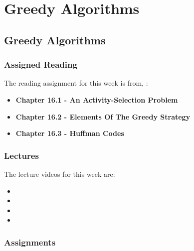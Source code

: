 \clearpage

\renewcommand{\ChapTitle}{Greedy Algorithms}
\renewcommand{\SectionTitle}{Greedy Algorithms}

\chapter{\ChapTitle}
\section{\SectionTitle}

\subsection{Assigned Reading}

The reading assignment for this week is from, \Textbook:

\begin{itemize}
    \item \textbf{Chapter 16.1 - An Activity-Selection Problem}
    \item \textbf{Chapter 16.2 - Elements Of The Greedy Strategy}
    \item \textbf{Chapter 16.3 - Huffman Codes}
\end{itemize}

\subsection{Lectures}

The lecture videos for this week are:

\begin{itemize}
    \item {}
    \item {}
    \item {}
    \item {}
\end{itemize}

\subsection{Assignments}

